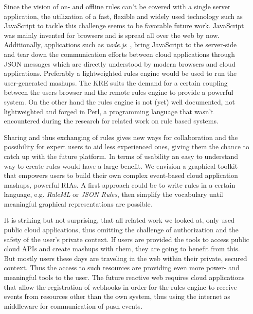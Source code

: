 \documentclass[11pt]{article}%
\begin{document}
Since the vision of on- and offline rules can't be covered with a single server application, the utilization of a fast, flexible and widely used technology such as JavaScript to tackle this challenge seems to be favorable future work. JavaScript was mainly invented for browsers and is spread all over the web by now. Additionally, applications such as \emph{node.js}~\cite{wwwnodejs}, bring JavaScript to the server-side and tear down the communication efforts between cloud applications through JSON messages which are directly understood by modern browsers and cloud applications.
Preferably a lightweighted rules engine would be used to run the user-generated mashups. The KRE suits the demand for a certain coupling between the users browser and the remote rules engine to provide a powerful system. On the other hand the rules engine is not (yet) well documented, not lightweighted and forged in Perl, a programming language that wasn't encountered during the research for related work on rule based systems.

Sharing and thus exchanging of rules gives new ways for collaboration and the possibility for expert users to aid less experienced ones, giving them the chance to catch up with the future platform. 
In terms of usability an easy to understand way to create rules would have a large benefit. We envision a graphical toolkit that empowers users to build their own complex event-based cloud application mashups, powerful RIAs.
A first approach could be to write rules in a certain language, e.g. \emph{RuleML} or \emph{JSON Rules}, then simplify the vocabulary until meaningful graphical representations are possible.

It is striking but not surprising, that all related work we looked at, only used public cloud applications, thus omitting the challenge of authorization and the safety of the user's private context.
If users are provided the tools to access public cloud APIs and create mashups with them, they are going to benefit from this. But mostly users these days are traveling in the web within their private, secured context. Thus the access to such resources are providing even more power- and meaningful tools to the user. The future reactive web requires cloud applications that allow the registration of webhooks in order for the rules engine to receive events from resources other than the own system, thus using the internet as middleware for communication of push events.



\end{document}
